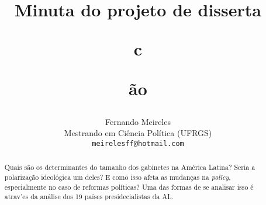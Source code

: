 \documentclass[11pt]{article}
\begin{document}
\title{Minuta do projeto de disserta\caption{c}\~{a}o}
\author{Fernando Meireles \\ Mestrando em Ci\^encia Pol\'itica (UFRGS)\\ \texttt{meirelesff@hotmail.com}}
\date{}
\maketitle
\begin{abstract}
Quais s\~{a}o os determinantes do tamanho dos gabinetes na Am\'{e}rica Latina? Seria a polariza\c{c}\~{a}o ideol\'ogica um deles? E como isso afeta as mudan\c{c}as na \emph{policy}, especialmente no caso de reformas pol\'iticas? Uma das formas de se analisar isso \'e atrav'es da an\'alise dos 19 pa\'ises presidecialistas da AL.
\end{abstract}
\end{document}
